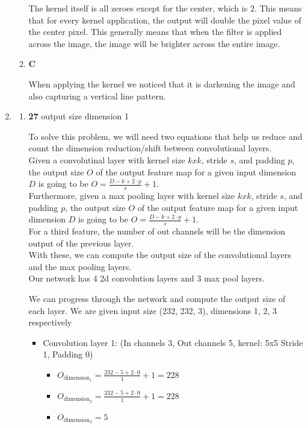 \documentclass[12pt]{article}
\begin{document}
\begin{enumerate}
\begin{enumerate}
  The kernel itself is all zeroes except for the center, which is 2. This means that for every kernel application, the output will double the pixel value of the center pixel. This generally means that when the filter is applied across the image, the image will be brighter across the entire image. 


  \item \textbf{C}
  
  When applying the kernel we noticed that it is darkening the image and also capturing a vertical line pattern. 
  \end{enumerate}

\item
  \begin{enumerate}
  \item \textbf{27} output size dimension 1

  To solve this problem, we will need two equations that help us reduce and count the dimension reduction/shift between convolutional layers. \\ 

  Given a convolutinal layer with kernel size $k x k$, stride $s$, and padding $p$, the output size $O$ of the output feature map for a given input dimension $D$ is going to be $O = \frac{D - k + 2 \cdot p}{s} + 1$. \\ 
  Furthermore, given a max pooling layer with kernel size $k x k$, stride $s$, and padding $p$, the output size $O$ of the output feature map for a given input dimension $D$ is going to be $O = \frac{D - k + 2 \cdot p}{s} + 1$. \\
  For a third feature, the number of out channels will be the dimension output of the previous layer. \\ 

  With these, we can compute the output size of the convolutional layers and the max pooling layers. \\ 
  Our network has 4 2d convolution layers and 3 max pool layers.

  We can progress through the network and compute the output size of each layer. We are given input size (232, 232, 3), dimensions 1, 2, 3 respectively \\ 
  \begin{itemize}
    \item Convolution layer 1: (In channels 3, Out channels 5, kernel: 5x5 Stride 1, Padding 0)\\ 
      \begin{itemize}
        \item $O_{\text{dimension}_1} = \frac{232 - 5 + 2 \cdot 0}{1} + 1 = 228$ 
        \item$O_{\text{dimension}_2} = \frac{232 - 5 + 2 \cdot 0}{1} + 1 = 228$ 
        \item $O_{\text{dimension}_3} = 5$ 
      \end{itemize}


\end{itemize}
\end{enumerate}
\end{enumerate}
\end{document}
